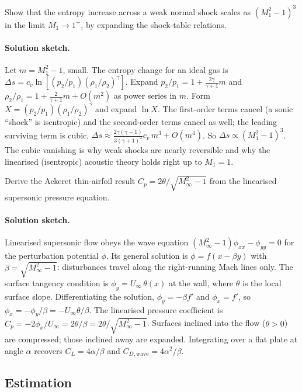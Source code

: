 \begin{exercise}
Show that the entropy increase across a weak normal shock scales
as $(M_1^2 - 1)^3$ in the limit $M_1 \to 1^+$, by expanding the
shock-table relations.
\paragraph{Solution sketch.} Let $m = M_1^2 - 1$, small. The entropy
change for an ideal gas is $\Delta s = c_v \ln[(p_2/p_1)(\rho_1/
\rho_2)^\gamma]$. Expand $p_2/p_1 = 1 + \frac{2\gamma}{\gamma+1}m$ and
$\rho_2/\rho_1 = 1 + \frac{2}{\gamma+1}m + O(m^2)$ as power series in
$m$. Form $X = (p_2/p_1)(\rho_1/\rho_2)^\gamma$ and expand $\ln X$.
The first-order terms cancel (a sonic ``shock'' is isentropic) and the
second-order terms cancel as well; the leading surviving term is cubic,
$\Delta s \approx \frac{2\gamma(\gamma - 1)}{3(\gamma + 1)^2}c_v\,m^3 +
O(m^4)$. So $\Delta s \propto (M_1^2 - 1)^3$. The cubic vanishing is
why weak shocks are nearly reversible and why the linearised
(isentropic) acoustic theory holds right up to $M_1 = 1$.
\end{exercise}

\begin{exercise}
Derive the Ackeret thin-airfoil result $C_p = 2\theta/\sqrt{M_
\infty^2 - 1}$ from the linearised supersonic pressure equation.
\paragraph{Solution sketch.} Linearised supersonic flow obeys the
wave equation $(M_\infty^2 - 1)\phi_{xx} - \phi_{yy} = 0$ for the
perturbation potential $\phi$. Its general solution is $\phi =
f(x - \beta y)$ with $\beta = \sqrt{M_\infty^2 - 1}$: disturbances
travel along the right-running Mach lines only. The surface
tangency condition is $\phi_y = U_\infty\,\theta(x)$ at the wall,
where $\theta$ is the local surface slope. Differentiating the
solution, $\phi_y = -\beta f'$ and $\phi_x = f'$, so $\phi_x =
-\phi_y/\beta = -U_\infty\theta/\beta$. The linearised pressure
coefficient is $C_p = -2\phi_x/U_\infty = 2\theta/\beta =
2\theta/\sqrt{M_\infty^2 - 1}$. Surfaces inclined into the flow
($\theta > 0$) are compressed; those inclined away are expanded.
Integrating over a flat plate at angle $\alpha$ recovers $C_L =
4\alpha/\beta$ and $C_{D,\text{wave}} = 4\alpha^2/\beta$.
\end{exercise}

\subsection*{Estimation}

